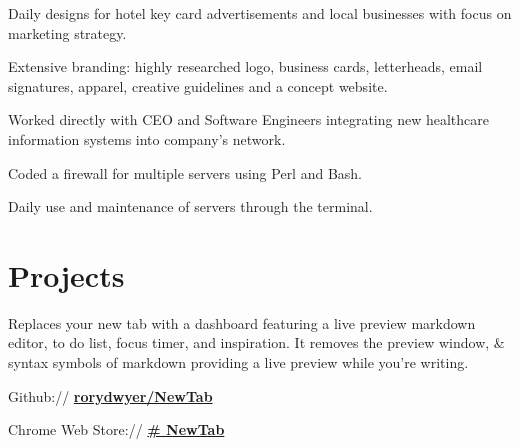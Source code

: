 \documentclass[]{deedy-resume-openfont}
\begin{document}
\begin{minipage}[t]{0.66\textwidth}
\begin{tightemize}
\item Daily designs for hotel key card advertisements and local businesses with focus on marketing strategy.
\item Extensive branding: highly researched logo, business cards, letterheads, email signatures, apparel, creative guidelines and a concept website.
\end{tightemize}
\sectionsep

\begin{tightemize}
\item Worked directly with CEO and Software Engineers integrating new healthcare information systems into company’s network.
\item Coded a firewall for multiple servers using Perl and Bash.
\item Daily use and maintenance of servers through the terminal.
\end{tightemize}
\sectionsep


\section{Projects}
Replaces your new tab with a dashboard featuring a live preview markdown editor, to do list, focus timer, and inspiration. It removes the preview window, \& syntax symbols of markdown providing a live preview while you’re writing.
\paragraphsep
\begin{tightemize}
\item Github:// \href{https://github.com/rorydwyer/NewTab}{\bf rorydwyer/NewTab}
\item Chrome Web Store:// \href{https://chrome.google.com/webstore/detail/newtab/fpmfnjdkdiihflfolajcipeldbicolap}{\bf \# NewTab}
\end{tightemize}
\sectionsep




\end{minipage} 
\end{document}

